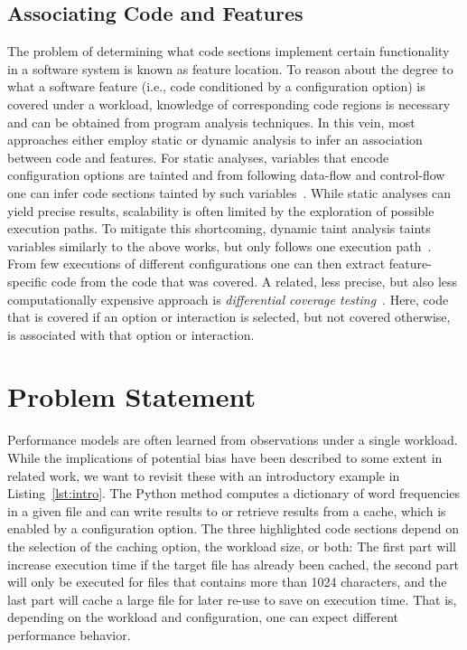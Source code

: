 \subsection{Associating Code and Features}\label{sec:feature_location}
The problem of determining what code sections implement certain functionality in a software system is known as feature location. To reason about the degree to what a software feature (i.e., code conditioned by a configuration option) is covered under a workload, knowledge of corresponding code regions is necessary and can be obtained from program analysis techniques.
In this vein, most approaches either employ static or dynamic analysis to infer an association between code and features. For static analyses, variables that encode configuration options are tainted and from following data-flow and control-flow one can infer code sections tainted by such variables~\cite{velez_2020_configcrusher_jase,lillack_2018_lotrack_tse,luo_2019_cova}.
While static analyses can yield precise results, scalability is often limited by the exploration of possible execution paths. To mitigate this shortcoming, dynamic taint analysis taints variables similarly to the above works, but only follows one execution path~\cite{bell_phosphor_2014,velez_comprex_2021,splat_kim_2013}. From few executions of different configurations one can then extract feature-specific code from the code that was covered. A related, less precise, but also less computationally expensive approach is \emph{differential coverage testing}~\cite{wong_integrated_2005,wilde_early_1996,agrawal_fault_1995,simmons_industrial_2006,chen_dynamic_nodate,sherwood_reducing_nodate}. Here, code that is covered if an option or interaction is selected, but not covered otherwise, is associated with that option or interaction.


\section{Problem Statement}
Performance models are often learned from observations under a single workload. While the implications of potential bias have been described to some extent in related work, we want to revisit these with an introductory example in Listing~\ref{lst:intro}. The Python method computes a dictionary of word frequencies in a given file and can write results to or retrieve results from a cache, which is enabled by a configuration option. The three highlighted code sections depend on the selection of the caching option, the workload size, or both: The first part will increase execution time if the target file has already been cached, the second part will only be executed for files that contains more than 1024 characters, and the last part will cache a large file for later re-use to save on execution time. That is, depending on the workload and configuration, one can expect different performance behavior. 

